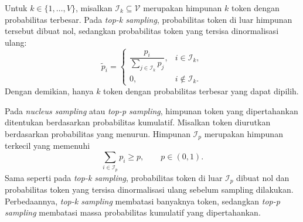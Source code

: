 \begin{definisi}
\label{def:topk}
Untuk $k\in\{1,\ldots,V\}$, misalkan
$\mathcal{I}_k\subseteq\mathcal{V}$ merupakan himpunan $k$ token
dengan probabilitas terbesar. Pada \textit{top-k sampling},
probabilitas token di luar himpunan tersebut dibuat nol, sedangkan
probabilitas token yang tersisa dinormalisasi ulang:
\begin{equation}
\widetilde p_i=
\begin{cases}
\dfrac{p_i}{\sum_{j\in\mathcal{I}_k}p_j},
& i\in\mathcal{I}_k,\\[1.5ex]
0, & i\notin\mathcal{I}_k.
\end{cases}
\label{eq:topk}
\end{equation}
Dengan demikian, hanya $k$ token dengan probabilitas terbesar
yang dapat dipilih.

Pada \textit{nucleus sampling} atau \textit{top-p sampling},
himpunan token yang dipertahankan ditentukan berdasarkan
probabilitas kumulatif. Misalkan token diurutkan berdasarkan
probabilitas yang menurun. Himpunan $\mathcal{I}_p$ merupakan
himpunan terkecil yang memenuhi
\begin{equation}
\sum_{i\in\mathcal{I}_p}p_i\geq p,
\qquad p\in(0,1).
\label{eq:nucleus}
\end{equation}
Sama seperti pada \textit{top-k sampling}, probabilitas token
di luar $\mathcal{I}_p$ dibuat nol dan probabilitas token yang
tersisa dinormalisasi ulang sebelum sampling dilakukan.
Perbedaannya, \textit{top-k sampling} membatasi banyaknya token,
sedangkan \textit{top-p sampling} membatasi massa probabilitas
kumulatif yang dipertahankan.
\end{definisi}

